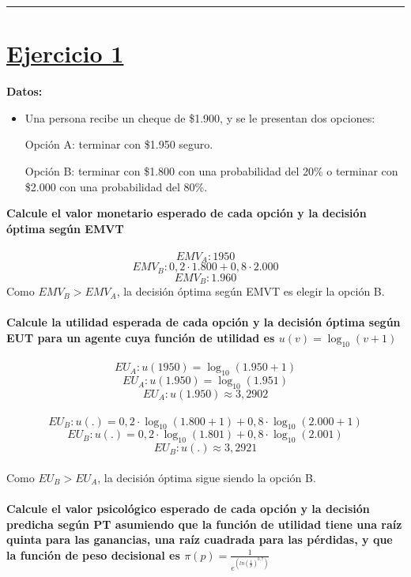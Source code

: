 \documentclass{article}
\newcommand*\sepline{%
  \begin{center}
    \rule[1ex]{.5\textwidth}{.5pt}
  \end{center}}
\begin{document}
\sepline

    \section*{\underline{Ejercicio 1}}
        \textbf{Datos:}
        \begin{itemize}
            \item Una persona recibe un cheque de \$1.900, y se le presentan dos opciones:
            
            Opción A: terminar con \$1.950 seguro.

            Opción B: terminar con \$1.800 con una probabilidad del 20\% o terminar con \$2.000 con una probabilidad del 80\%.
        \end{itemize}
        \textbf{Calcule el valor monetario esperado de cada opción y la decisión óptima según EMVT}
        \\
        \\
        \[EMV_{A}: 1950\]
        \[EMV_{B}: 0,2 \cdot 1.800 + 0,8 \cdot 2.000\]
        \[EMV_{B}: 1.960\]
        Como $EMV_{B} > EMV_{A}$, la decisión óptima según EMVT es elegir la opción B.
        \\
        \\
        \textbf{Calcule la utilidad esperada de cada opción y la decisión óptima según EUT para un agente cuya función de utilidad es \(u(v)=\log_{10} (v+1)\)}
        \\
        \\
        \[EU_{A}: u(1950) = \log_{10}(1.950 + 1)\]
        \[EU_{A}: u(1.950) = \log_{10}(1.951)\]
        \[EU_{A}: u(1.950) \approx 3,2902\]
        \\
        \[EU_{B}: u(.) = 0,2 \cdot \log_{10}(1.800 + 1) + 0,8 \cdot \log_{10}(2.000 + 1)\]
        \[EU_{B}: u(.) = 0,2 \cdot \log_{10}(1.801) + 0,8 \cdot \log_{10}(2.001)\]
        \[EU_{B}: u(.) \approx 3,2921\]
        \\
        Como \(EU_{B} > EU_{A}\), la decisión óptima sigue siendo la opción B.
        \\
        \\
        \textbf{Calcule el valor psicológico esperado de cada opción y la decisión predicha según PT asumiendo que la función de utilidad tiene una raíz quinta para las ganancias, una raíz cuadrada para las pérdidas, y que la función de peso decisional es \(\pi(p) = \frac{1}{e^{(ln(\frac{1}{p})^{0,7})}}\)}
        \\
        \\
\end{document}
